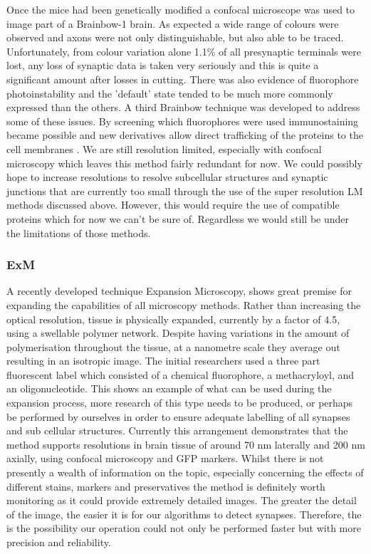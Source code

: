 \documentclass[a4paper, 11pt]{article}
\numberwithin{equation}{section}
\begin{document}
Once the mice had been genetically modified a confocal microscope was used to image part of a Brainbow-1 brain. As expected a wide range of colours were observed and axons were not only distinguishable, but also able to be traced.
Unfortunately, from colour variation alone 1.1\% of all presynaptic terminals were lost, any loss of synaptic data is taken very seriously and this is quite a significant amount\cite{Livet2007} after losses in cutting. There was also evidence of fluorophore photoinstability and the 'default' state tended to be much more commonly expressed than the others. A third Brainbow technique was developed to address some of these issues. By screening which fluorophores were used immunostaining became possible and new derivatives allow direct trafficking of the proteins to the cell membranes \cite{cai2013improved}. We are still resolution limited, especially with confocal microscopy which leaves this method fairly redundant for now. We could possibly hope to increase resolutions to resolve subcellular structures and synaptic junctions that are currently too small through the use of the super resolution LM methods discussed above. However, this would require the use of compatible proteins which for now we can't be sure of. Regardless we would still be under the limitations of those methods.

\subsubsection{ExM}
A recently developed technique Expansion Microscopy, shows great premise for expanding the capabilities of all microscopy methods. Rather than increasing the optical resolution, tissue is physically expanded, currently by a factor of 4.5, using a swellable polymer network. Despite having variations in the amount of polymerisation throughout the tissue, at a nanometre scale they average out resulting in an isotropic image. The initial researchers used a three part fluorescent label which consisted of a chemical fluorophore, a methacryloyl, and an oligonucleotide. This shows an example of what can be used during the expansion process, more research of this type needs to be produced, or perhaps be performed by ourselves in order to ensure adequate labelling of all synapses and sub cellular structures.
Currently this arrangement demonstrates that the method supports resolutions in brain tissue of around 70 nm laterally and 200 nm axially, using confocal microscopy and GFP markers. Whilst there is not presently a wealth of information on the topic, especially concerning the effects of different stains, markers and preservatives the method is definitely worth monitoring as it could provide extremely detailed images. The greater the detail of the image, the easier it is for our algorithms to detect synapses. Therefore, the is the possibility our operation could not only be performed faster but with more precision and reliability. \cite{chen2015expansion}\\
\end{document}
